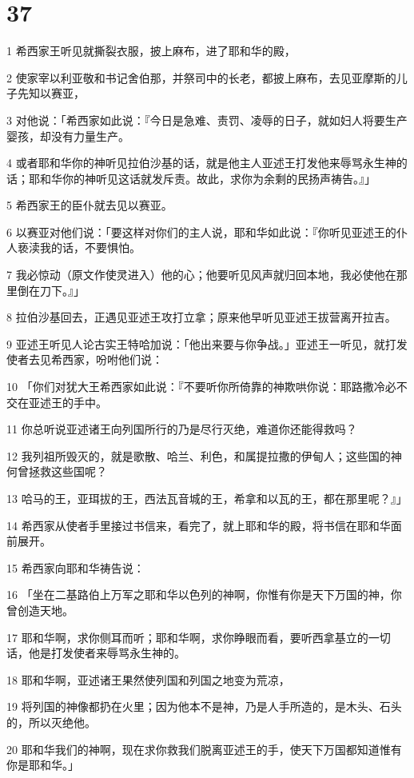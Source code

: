 \chapter{37}

\par 1 希西家王听见就撕裂衣服，披上麻布，进了耶和华的殿，
\par 2 使家宰以利亚敬和书记舍伯那，并祭司中的长老，都披上麻布，去见亚摩斯的儿子先知以赛亚，
\par 3 对他说：「希西家如此说：『今日是急难、责罚、凌辱的日子，就如妇人将要生产婴孩，却没有力量生产。
\par 4 或者耶和华你的神听见拉伯沙基的话，就是他主人亚述王打发他来辱骂永生神的话；耶和华你的神听见这话就发斥责。故此，求你为余剩的民扬声祷告。』」
\par 5 希西家王的臣仆就去见以赛亚。
\par 6 以赛亚对他们说：「要这样对你们的主人说，耶和华如此说：『你听见亚述王的仆人亵渎我的话，不要惧怕。
\par 7 我必惊动（原文作使灵进入）他的心；他要听见风声就归回本地，我必使他在那里倒在刀下。』」
\par 8 拉伯沙基回去，正遇见亚述王攻打立拿；原来他早听见亚述王拔营离开拉吉。
\par 9 亚述王听见人论古实王特哈加说：「他出来要与你争战。」亚述王一听见，就打发使者去见希西家，吩咐他们说：
\par 10 「你们对犹大王希西家如此说：『不要听你所倚靠的神欺哄你说：耶路撒冷必不交在亚述王的手中。
\par 11 你总听说亚述诸王向列国所行的乃是尽行灭绝，难道你还能得救吗？
\par 12 我列祖所毁灭的，就是歌散、哈兰、利色，和属提拉撒的伊甸人；这些国的神何曾拯救这些国呢？
\par 13 哈马的王，亚珥拔的王，西法瓦音城的王，希拿和以瓦的王，都在那里呢？』」
\par 14 希西家从使者手里接过书信来，看完了，就上耶和华的殿，将书信在耶和华面前展开。
\par 15 希西家向耶和华祷告说：
\par 16 「坐在二基路伯上万军之耶和华以色列的神啊，你惟有你是天下万国的神，你曾创造天地。
\par 17 耶和华啊，求你侧耳而听；耶和华啊，求你睁眼而看，要听西拿基立的一切话，他是打发使者来辱骂永生神的。
\par 18 耶和华啊，亚述诸王果然使列国和列国之地变为荒凉，
\par 19 将列国的神像都扔在火里；因为他本不是神，乃是人手所造的，是木头、石头的，所以灭绝他。
\par 20 耶和华我们的神啊，现在求你救我们脱离亚述王的手，使天下万国都知道惟有你是耶和华。」
